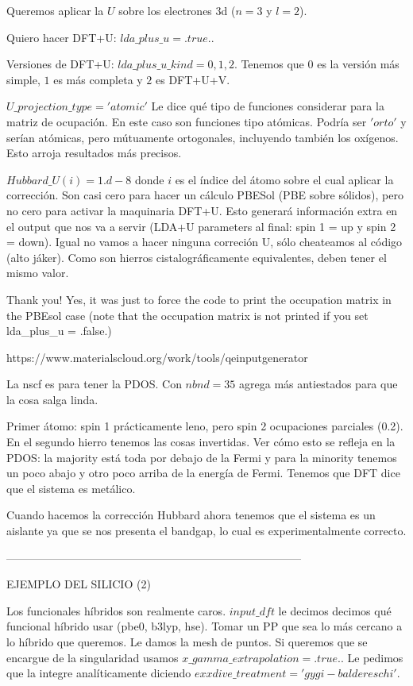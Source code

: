   Queremos aplicar la $U$ sobre los electrones 3d ($n=3$ y $l=2$).

  Quiero hacer DFT+U: $lda\_plus\_u = .true.$.

  Versiones de DFT+U: $lda\_plus\_u\_kind = 0,1,2$. Tenemos que $0$ es la versión más simple, $1$ es más completa y $2$ es DFT+U+V.

  $U\_projection\_type = 'atomic'$ Le dice qué tipo de funciones considerar para la matriz de ocupación. En este caso son funciones tipo atómicas. Podría ser $'orto'$ y serían atómicas, pero mútuamente ortogonales, incluyendo también los oxígenos. Esto arroja resultados más precisos.

  $Hubbard\_U(i) = 1.d-8$ donde $i$ es el índice del átomo sobre el cual aplicar la corrección. Son casi cero para hacer un cálculo PBESol (PBE sobre sólidos), pero no cero para activar la maquinaria DFT+U. Esto generará información extra en el output que nos va a servir (LDA+U parameters al final: spin 1 = up y spin 2 = down). Igual no vamos a hacer ninguna correción U, sólo cheateamos al código (alto jáker). Como son hierros cistalográficamente equivalentes, deben tener el mismo valor.

  Thank you! Yes, it was just to force the code to print the occupation matrix in the PBEsol case (note that the occupation matrix is not printed if you set lda\_plus\_u = .false.)

  https://www.materialscloud.org/work/tools/qeinputgenerator

  La nscf es para tener la PDOS. Con $nbnd = 35$ agrega más antiestados para que la cosa salga linda.

  Primer átomo: spin 1 prácticamente leno, pero spin 2 ocupaciones parciales (0.2). En el segundo hierro tenemos las cosas invertidas. Ver cómo esto se refleja en la PDOS: la majority está toda por debajo de la Fermi y para la minority tenemos un poco abajo y otro poco arriba de la energía de Fermi. Tenemos que DFT dice que el sistema es metálico.

  Cuando hacemos la corrección Hubbard ahora tenemos que el sistema es un aislante ya que se nos presenta el bandgap, lo cual es experimentalmente correcto.

  --------------------------------------------------------------------------------

  EJEMPLO DEL SILICIO (2)

  Los funcionales híbridos son realmente caros. $input\_dft$ le decimos decimos qué funcional híbrido usar (pbe0, b3lyp, hse). Tomar un PP que sea lo más cercano a lo híbrido que queremos. Le damos la mesh de puntos. Si queremos que se encargue de la singularidad usamos $x\_gamma\_extrapolation = .true.$. Le pedimos que la integre analíticamente diciendo $exxdive\_treatment = 'gygi-baldereschi'$.

